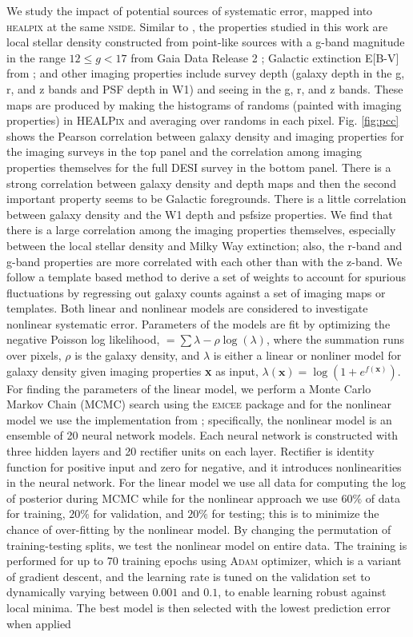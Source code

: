 We study the impact of potential sources of systematic error, mapped into \textsc{healpix} at the same \textsc{nside}. Similar to \cite{zhou2022target}, the properties studied in this work are local stellar density constructed from point-like sources with a g-band magnitude in the range $12 \leq g < 17$ from Gaia Data Release 2 \citep[see,][]{gaiadr2, myers2022};  Galactic extinction E[B-V] from \cite{schlegel1998maps}; and other imaging properties include survey depth (galaxy depth in the g, r, and z bands and PSF depth in W1) and seeing in the g, r, and z bands. These maps are produced by making the histograms of randoms (painted with imaging properties) in \textsc{HEALPix} and averaging over randoms in each pixel. Fig. \ref{fig:pcc} shows the Pearson correlation between galaxy density and imaging properties for the imaging surveys in the top panel and the correlation among imaging properties themselves for the full DESI survey in the bottom panel. There is a strong correlation between galaxy density and depth maps and then the second important property seems to be Galactic foregrounds. There is a little correlation between galaxy density and the W1 depth and psfsize properties. We find that there is a large correlation among the imaging properties themselves, especially between the local stellar density and Milky Way extinction; also, the r-band and g-band properties are more correlated with each other than with the z-band. We follow a template based method to derive a set of weights to account for spurious fluctuations by regressing out galaxy counts against a set of imaging maps or templates. Both linear and nonlinear models are considered to investigate nonlinear systematic error. Parameters of the models are fit by optimizing the negative Poisson log likelihood, $= \sum \lambda - \rho \log(\lambda)$, where the summation runs over pixels, $\rho$ is the galaxy density, and $\lambda$ is either a linear or nonliner model for galaxy density given imaging properties \textbf{x} as input, $\lambda(\textbf{x}) = \log (1+e^{f(\textbf{x})})$. For finding the parameters of the linear model, we perform a Monte Carlo Markov Chain (MCMC) search using the \textsc{emcee} package  and for the nonlinear model we use the implementation from ; specifically, the nonlinear model is an ensemble of 20 neural network models. Each neural network is constructed with three hidden layers and 20 rectifier units on each layer. Rectifier is identity function for positive input and zero for negative, and it introduces nonlinearities in the neural network. For the linear model we use all data for computing the log of posterior during MCMC while for the nonlinear approach we use $60\%$ of data for training, $20\%$ for validation, and $20\%$ for testing; this is to minimize the chance of over-fitting by the nonlinear model. By changing the permutation of training-testing splits, we test the nonlinear model on entire data. The training is performed for up to 70 training epochs using \textsc{Adam} optimizer, which is a variant of gradient descent, and the learning rate is tuned on the validation set to dynamically varying between $0.001$ and $0.1$, to enable learning robust against local minima. The best model is then selected with the lowest prediction error when applied 
